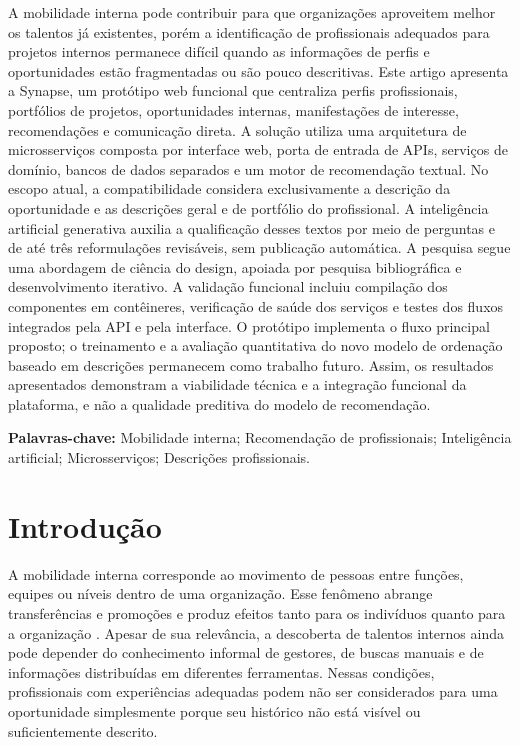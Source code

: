 \documentclass[12pt]{article}
\begin{document}
\begin{resumo}
  A mobilidade interna pode contribuir para que organizações aproveitem melhor os talentos já existentes, porém a identificação de profissionais adequados para projetos internos permanece difícil quando as informações de perfis e oportunidades estão fragmentadas ou são pouco descritivas. Este artigo apresenta a Synapse, um protótipo web funcional que centraliza perfis profissionais, portfólios de projetos, oportunidades internas, manifestações de interesse, recomendações e comunicação direta. A solução utiliza uma arquitetura de microsserviços composta por interface web, porta de entrada de APIs, serviços de domínio, bancos de dados separados e um motor de recomendação textual. No escopo atual, a compatibilidade considera exclusivamente a descrição da oportunidade e as descrições geral e de portfólio do profissional. A inteligência artificial generativa auxilia a qualificação desses textos por meio de perguntas e de até três reformulações revisáveis, sem publicação automática. A pesquisa segue uma abordagem de ciência do design, apoiada por pesquisa bibliográfica e desenvolvimento iterativo. A validação funcional incluiu compilação dos componentes em contêineres, verificação de saúde dos serviços e testes dos fluxos integrados pela API e pela interface. O protótipo implementa o fluxo principal proposto; o treinamento e a avaliação quantitativa do novo modelo de ordenação baseado em descrições permanecem como trabalho futuro. Assim, os resultados apresentados demonstram a viabilidade técnica e a integração funcional da plataforma, e não a qualidade preditiva do modelo de recomendação.

  \vspace{0.5cm}
  \noindent \textbf{Palavras-chave:} Mobilidade interna; Recomendação de profissionais; Inteligência artificial; Microsserviços; Descrições profissionais.
\end{resumo}

\section{Introdução}

A mobilidade interna corresponde ao movimento de pessoas entre funções, equipes ou níveis dentro de uma organização. Esse fenômeno abrange transferências e promoções e produz efeitos tanto para os indivíduos quanto para a organização \cite{ray2024internal}. Apesar de sua relevância, a descoberta de talentos internos ainda pode depender do conhecimento informal de gestores, de buscas manuais e de informações distribuídas em diferentes ferramentas. Nessas condições, profissionais com experiências adequadas podem não ser considerados para uma oportunidade simplesmente porque seu histórico não está visível ou suficientemente descrito.
\end{document}
